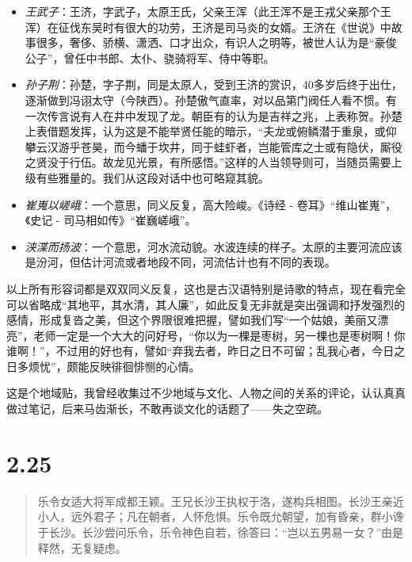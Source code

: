 \documentclass[]{book}
\providecommand{\tightlist}{%
  \setlength{\itemsep}{0pt}\setlength{\parskip}{0pt}}
\begin{document}
\begin{itemize}
\tightlist
\item
  \emph{王武子}：王济，字武子，太原王氏，父亲王浑（此王浑不是王戎父亲那个王浑）在征伐东吴时有很大的功劳，王济是司马炎的女婿。王济在《世说》中故事很多，奢侈、骄横、潇洒、口才出众，有识人之明等，被世人认为是``豪俊公子''，曾任中书郎、太仆、骁骑将军、侍中等职。
\item
  \emph{孙子荆}：孙楚，字子荆，同是太原人，受到王济的赏识，40多岁后终于出仕，逐渐做到冯诩太守（今陕西）。孙楚傲气直率，对以品第门阀任人看不惯。有一次传言说有人在井中发现了龙。朝臣有的认为是吉祥之兆，上表称贺。孙楚上表借题发挥，认为这是不能举贤任能的暗示，``夫龙或俯鳞潜于重泉，或仰攀云汉游乎苍昊，而今蟠于坎井，同于蛙虾者，岂能管库之士或有隐伏，厮役之贤没于行伍。故龙见光景，有所感悟。''这样的人当领导则可，当随员需要上级有些雅量的。我们从这段对话中也可略窥其貌。
\item
  \emph{崔嵬以嵯峨}：一个意思，同义反复，高大险峻。《诗经 -
  卷耳》``维山崔嵬''，《史记 - 司马相如传》``崔巍嵯峨''。
\item
  \emph{浃渫而扬波}：一个意思，河水流动貌。水波连续的样子。太原的主要河流应该是汾河，但估计河流或者地段不同，河流估计也有不同的表现。
\end{itemize}

以上所有形容词都是双双同义反复，这也是古汉语特别是诗歌的特点，现在看完全可以省略成``其地平，其水清，其人廉''，如此反复无非就是突出强调和抒发强烈的感情，形成复沓之美，但这个界限很难把握，譬如我们写``一个姑娘，美丽又漂亮''，老师一定是一个大大的问好号，``你以为一棵是枣树，另一棵也是枣树啊！你谁啊！''，不过用的好也有，譬如``弃我去者，昨日之日不可留；乱我心者，今日之日多烦忧''，颇能反映徘徊悱恻的心情。

这是个地域贴，我曾经收集过不少地域与文化、人物之间的关系的评论，认认真真做过笔记，后来马齿渐长，不敢再谈文化的话题了------失之空疏。

\section{2.25}\label{section-71}

\begin{quote}
乐令女适大将军成都王颖。王兄长沙王执权于洛，遂构兵相图。长沙王亲近小人，远外君子；凡在朝者，人怀危惧。乐令既允朝望，加有昏亲，群小谗于长沙。长沙尝问乐令，乐令神色自若，徐答曰：``岂以五男易一女？''由是释然，无复疑虑。
\end{quote}
\end{document}
